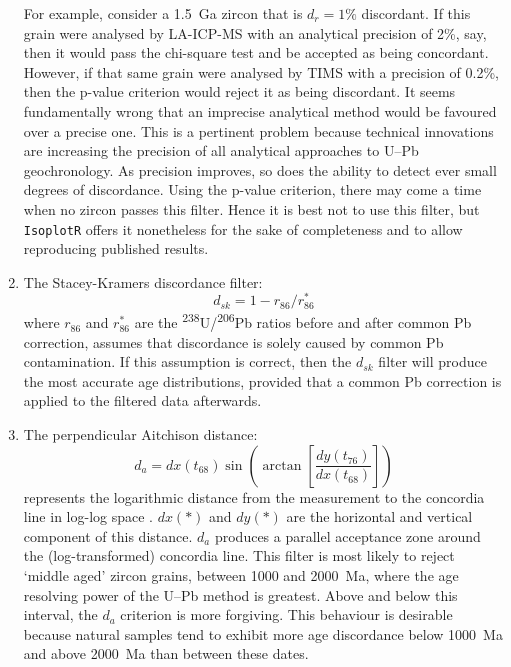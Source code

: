 \begin{refsection}
\begin{enumerate}
    For example, consider a 1.5~Ga zircon that is $d_r=1\%$
    discordant. If this grain were analysed by LA-ICP-MS with an
    analytical precision of 2\%, say, then it would pass the
    chi-square test and be accepted as being concordant. However, if
    that same grain were analysed by TIMS with a precision of 0.2\%,
    then the p-value criterion would reject it as being discordant. It
    seems fundamentally wrong that an imprecise analytical method
    would be favoured over a precise one. This is a pertinent problem
    because technical innovations are increasing the precision of all
    analytical approaches to U--Pb geochronology.  As precision
    improves, so does the ability to detect ever small degrees of
    discordance. Using the p-value criterion, there may come a time
    when no zircon passes this filter.  Hence it is best not to use
    this filter, but \texttt{IsoplotR} offers it nonetheless for the
    sake of completeness and to allow reproducing published results.
  \item The Stacey-Kramers discordance filter:
    \begin{equation}
      d_{sk} = 1 - r_{86}/r_{86}^\ast
    \end{equation}
    \noindent where $r_{86}$ and $r_{86}^\ast$ are the
    \textsuperscript{238}U/\textsuperscript{206}Pb ratios before and
    after common Pb correction, assumes that discordance is solely
    caused by common Pb contamination. If this assumption is correct,
    then the $d_{sk}$ filter will produce the most accurate age
    distributions, provided that a \citet{stacey1975} common Pb
    correction is applied to the filtered data afterwards.
  \item The perpendicular Aitchison distance:
    \begin{equation}
      d_{a} = dx(t_{68}) \sin\!\left(\arctan\!\left[
        \frac{dy(t_{76})}{dx(t_{68})} \right] \right)
    \end{equation}
    \noindent represents the logarithmic distance from the measurement
    to the concordia line in log-log space
    \citep{vermeesch2021}. $dx(\ast)$ and $dy(\ast)$ are the
    horizontal and vertical component of this distance. $d_a$ produces
    a parallel acceptance zone around the (log-transformed) concordia
    line. This filter is most likely to reject `middle aged' zircon
    grains, between 1000 and 2000~Ma, where the age resolving power of
    the U--Pb method is greatest. Above and below this interval, the
    $d_a$ criterion is more forgiving. This behaviour is desirable
    because natural samples tend to exhibit more age discordance below
    1000~Ma and above 2000~Ma than between these dates.


\end{enumerate}
\end{refsection}
